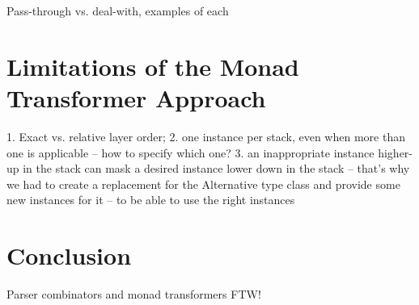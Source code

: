 \documentclass{tmr}
\begin{document}
Pass-through vs. deal-with, examples of each


\section{Limitations of the Monad Transformer Approach}

1. Exact vs. relative layer order; 
2. one instance per stack, even when more than one is applicable --
how to specify which one?
3. an inappropriate instance higher-up in the stack can mask a 
desired instance lower down in the stack -- that's why we had to
create a replacement for the Alternative type class and provide
some new instances for it -- to be able to use the right instances



\section{Conclusion}

Parser combinators and monad transformers FTW!



\end{document}
